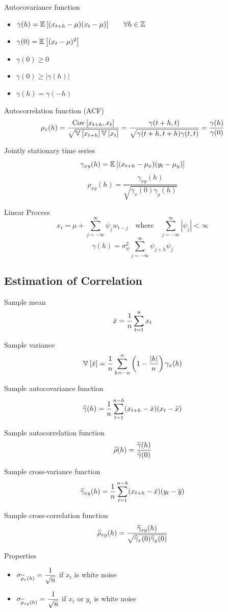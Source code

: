 \documentclass[landscape]{article}
\begin{document}
\begin{multicols*}{2}
Autocovariance function 
\begin{itemize}
  \item $\gamma(h) = \mathbb{E}_{}\left[(x_{t+h}-\mu)(x_t-\mu)\right] \qquad \forall h\in\mathbb{Z}$
  \item $\gamma(0) = \mathbb{E}_{}\left[(x_t-\mu)^2\right]$
  \item $\gamma(0) \ge 0$
  \item $\gamma(0) \ge |\gamma(h)|$
  \item $\gamma(h) = \gamma(-h)$
\end{itemize}

Autocorrelation function (ACF)
$$\rho_x(h) = \frac{\mathrm{Cov}_{}\left[x_{t+h},x_t\right]}{\sqrt{\mathbb{V}_{}\left[x_{t+h}\right]\mathbb{V}_{}\left[x_t\right]}}
          = \frac{\gamma(t+h,t)}{\sqrt{\gamma(t+h,t+h)\gamma(t,t)}}
          = \frac{\gamma(h)}{\gamma(0)}$$

Jointly stationary time series
$$\gamma_{xy}(h) = \mathbb{E}_{}\left[(x_{t+h}-\mu_x)(y_t-\mu_y)\right]$$
$$\rho_{xy}(h) = \frac{\gamma_{xy}(h)}{\sqrt{\gamma_x(0)\gamma_y(h)}}$$

Linear Process
$$x_t = \mu + \sum_{j=-\infty}^\infty \psi_j w_{t-j} \quad\text{where}\quad
\sum_{j=-\infty}^\infty |\psi_j| < \infty$$
$$\gamma(h) = \sigma_w^2 \sum_{j=-\infty}^\infty \psi_{j+h}\psi_j$$

\subsection{Estimation of Correlation}

Sample mean
$$\bar{x} = \frac{1}{n}\sum_{t=1}^n x_t$$

Sample variance
$$\mathbb{V}_{}\left[\bar{x}\right] = \frac{1}{n}\sum_{h=-n}^n \left(1-\frac{|h|}{n}\right)\gamma_x(h)$$

Sample autocovariance function
$$\widehat{\gamma}(h) = \frac{1}{n}\sum_{t=1}^{n-h}(x_{t+h}-\bar{x})(x_t-\bar{x})$$

Sample autocorrelation function
$$\widehat{\rho}(h) = \frac{\widehat{\gamma}(h)}{\widehat{\gamma}(0)}$$

Sample cross-variance function
$$\widehat{\gamma}_{xy}(h) = \frac{1}{n} \sum_{t=1}^{n-h}(x_{t+h}-\bar{x})(y_t - \overline{y})$$

Sample cross-correlation function
$$\widehat{\rho}_{xy}(h) = \frac{\widehat{\gamma}_{xy}(h)}{\sqrt{\widehat{\gamma}_x(0) \widehat{\gamma}_y(0)}}$$

Properties
\begin{itemize}
  \item $\sigma_{\widehat{\rho}_x(h)} = \displaystyle\frac{1}{\sqrt{n}}$ 
    if $x_t$ is white noise
  \item $\sigma_{\widehat{\rho}_{xy}(h)} = \displaystyle\frac{1}{\sqrt{n}}$
    if $x_t$ or $y_t$ is white noise
\end{itemize}


\end{multicols*}
\end{document}
